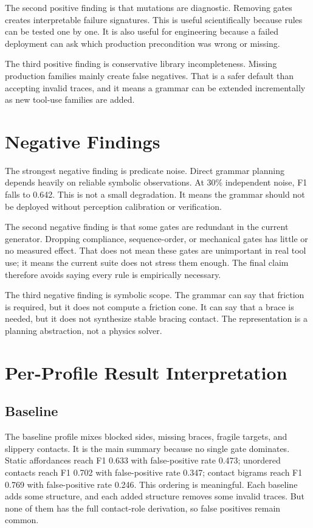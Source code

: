 \documentclass{article}
\begin{document}
The second positive finding is that mutations are diagnostic. Removing gates creates interpretable failure signatures. This is useful scientifically because rules can be tested one by one. It is also useful for engineering because a failed deployment can ask which production precondition was wrong or missing.

The third positive finding is conservative library incompleteness. Missing production families mainly create false negatives. That is a safer default than accepting invalid traces, and it means a grammar can be extended incrementally as new tool-use families are added.

\section{Negative Findings}

The strongest negative finding is predicate noise. Direct grammar planning depends heavily on reliable symbolic observations. At 30\% independent noise, F1 falls to 0.642. This is not a small degradation. It means the grammar should not be deployed without perception calibration or verification.

The second negative finding is that some gates are redundant in the current generator. Dropping compliance, sequence-order, or mechanical gates has little or no measured effect. That does not mean these gates are unimportant in real tool use; it means the current suite does not stress them enough. The final claim therefore avoids saying every rule is empirically necessary.

The third negative finding is symbolic scope. The grammar can say that friction is required, but it does not compute a friction cone. It can say that a brace is needed, but it does not synthesize stable bracing contact. The representation is a planning abstraction, not a physics solver.

\section{Per-Profile Result Interpretation}

\subsection{Baseline}

The baseline profile mixes blocked sides, missing braces, fragile targets, and slippery contacts. It is the main summary because no single gate dominates. Static affordances reach F1 0.633 with false-positive rate 0.473; unordered contacts reach F1 0.702 with false-positive rate 0.347; contact bigrams reach F1 0.769 with false-positive rate 0.246. This ordering is meaningful. Each baseline adds some structure, and each added structure removes some invalid traces. But none of them has the full contact-role derivation, so false positives remain common.
\end{document}
